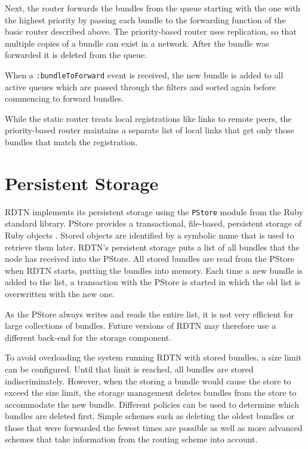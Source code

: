 \documentclass[a4paper]{article}
\begin{document}
Next, the router forwards the bundles from the queue starting with the one with
the highest priority by passing each bundle to the forwarding function of the
basic router described above. The priority-based router uses replication, so
that multiple copies of a bundle can exist in a network.  After the bundle was
forwarded it is deleted from the queue.

When a {\tt :bundleToForward} event is received, the new bundle is added to all
active queues which are passed through the filters and sorted again before
commencing to forward bundles.

While the static router treats local registrations like links to remote peers,
the priority-based router maintains a separate list of local links that get only
those bundles that match the registration.

\section{Persistent Storage}\label{sec.storage}

RDTN implements its persistent storage using the {\tt PStore} module from the
Ruby standard library. PStore provides a transactional, file-based, persistent
storage of Ruby objects \cite{pickaxe}.  Stored objects are identified by a
symbolic name that is used to retrieve them later. RDTN's persistent storage
puts a list of all bundles that the node has received into the PStore. All
stored bundles are read from the PStore when RDTN starts, putting the bundles
into memory. Each time a new bundle is added to the list, a transaction with the
PStore is started in which the old list is overwritten with the new one. 

As the PStore always writes and reads the entire list, it is not very efficient
for large collections of bundles. Future versions of RDTN may therefore use a
different back-end for the storage component.

To avoid overloading the system running RDTN with stored bundles, a size limit
can be configured. Until that limit is reached, all bundles are stored
indiscriminately. However, when the storing a bundle would cause the store to
exceed the size limit, the storage management deletes
bundles from the store to accommodate the new bundle. Different policies can be
used to determine which bundles are deleted first. Simple schemes such as
deleting the oldest bundles or those that were forwarded the fewest times are
possible as well as more advanced schemes that take information from the routing
scheme into account.
\end{document}
